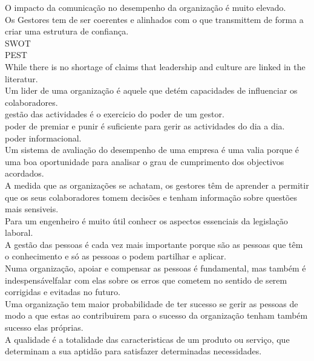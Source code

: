 O impacto da comunicação no desempenho da organização é muito elevado.\\
Os Gestores tem de ser coerentes e alinhados com o que transmittem de forma a criar uma estrutura de confiança.\\

SWOT\\
PEST\\
While there is no shortage of claims that leadership and culture are linked in the
literatur.\\

Um lider de uma organização é aquele que detém capacidades de influenciar os colaboradores.\\

gestão das actividades é o exercicio do poder de um gestor.\\

poder de premiar e punir é suficiente para gerir as actividades do dia a dia.\\

poder informacional.\\

Um sistema de avaliação do desempenho de uma empresa é uma valia porque é uma boa oportunidade para analisar o grau de cumprimento dos objectivos acordados.\\

A medida que as organizações se achatam, os gestores têm de aprender a permitir que os seus colaboradores tomem decisões e tenham informação sobre questões mais sensiveis.\\

Para um engenheiro é muito útil conhecr os aspectos essenciais da legislação laboral.\\

A gestão das pessoas é cada vez mais importante porque são as pessoas que têm o conhecimento e só as pessoas o podem partilhar e aplicar.\\

Numa organização, apoiar e compensar as pessoas é fundamental, mas também é indespensávelfalar com elas sobre os erros que cometem no sentido de serem corrigidas e evitadas no futuro.\\

Uma organização tem maior probabilidade de ter sucesso se gerir as pessoas de modo a que estas ao contribuirem para o sucesso da organização tenham também sucesso elas próprias.\\

A qualidade é a totalidade das caracteristicas de um produto ou serviço, que determinam a sua aptidão para satisfazer determinadas necessidades.\\

